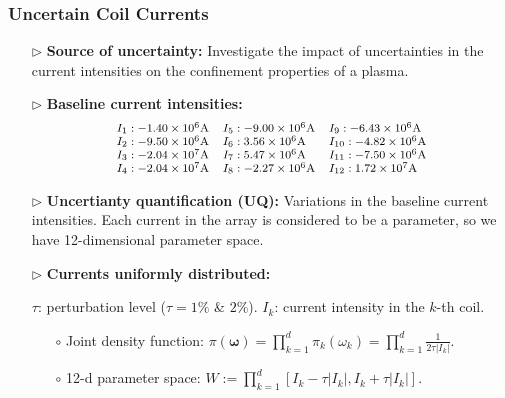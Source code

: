 \documentclass{beamer}
\begin{document}
\begin{frame}[t]
    \frametitle{Uncertain Coil Currents}
    \begin{itemize}[leftmargin=5pt]
        \item[$\triangleright$] \textcolor{myblue3}{\bf Source of uncertainty:} {\footnotesize Investigate the impact of \textcolor{myblue3}{uncertainties in the current intensities} on the confinement properties of a plasma.}
        
        \item[$\triangleright$] \textcolor{myred}{\bf Baseline current intensities:} 
        \[
        \footnotesize
        \begin{array}{lll}
        I_1: -1.40\times 10^6\text{A} &I_5: -9.00\times 10^6\text{A} &I_9:  -6.43\times 10^6\text{A} \\
        I_2: -9.50\times 10^6\text{A} &I_6: 3.56\times 10^6\text{A}  & I_{10}:  -4.82\times 10^6\text{A} \\
        I_3: -2.04\times 10^7\text{A} &I_7:  5.47\times 10^6\text{A}  &I_{11}:  -7.50\times 10^6\text{A} \\
        I_4: -2.04\times 10^7\text{A} &I_8: -2.27\times 10^6\text{A} &I_{12}:  1.72\times 10^7\text{A} 
        \end{array}
        \]
        \item[$\triangleright$] \textcolor{myblue3}{\bf Uncertianty quantification (UQ):} {\footnotesize Variations in the baseline current intensities. Each current in the array is considered to be a parameter, so we have 12-dimensional parameter space.}
        
        
        \item[$\triangleright$] \textcolor{myblue3}{\bf Currents uniformly distributed:} 

        {\footnotesize
        \textcolor{mygray3}{$\tau$: perturbation level ($\tau= 1\%$ \& $2\%$). \quad $I_k$: current intensity in the $k$-th coil.}
        

        \begin{itemize}[leftmargin=15pt]   
            \item[$\circ$] Joint density function: $\displaystyle
             \pi \left(\boldsymbol{\omega}\right)=\prod_{k=1}^{d} \pi_k\left(\omega_{k}\right)=\prod_{k=1}^{d} \frac{1}{2\tau |I_k|}$.
            \item[$\circ$] 12-d parameter space: $\displaystyle W := \prod_{k=1}^{d}\left[I_k-\tau|I_k|,I_k+\tau|I_k|\right]$.
        \end{itemize}
        \par}
    \end{itemize}
\end{frame}	
\end{document}
